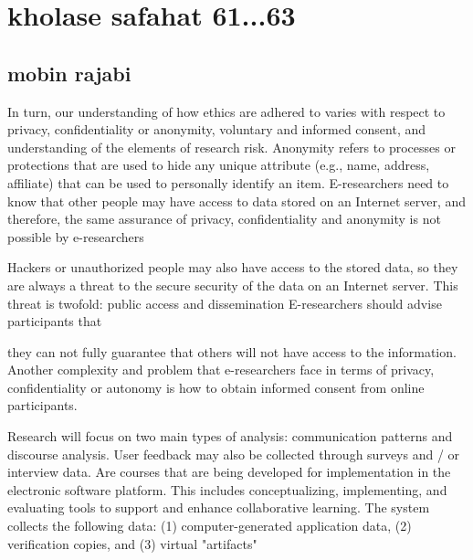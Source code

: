 \documentclass [12pt]{beamer}
\begin{document}
\section*{kholase safahat 61...63}
\subsection*{mobin rajabi}	
\begin{frame}
\justifying	
In turn, our understanding of how ethics are adhered to varies with respect to privacy, confidentiality or anonymity, voluntary and informed consent, and understanding of the elements of research risk.
Anonymity refers to processes or protections that are used to hide any unique attribute (e.g., name, address, affiliate) that can be used to personally identify an item.
E-researchers need to know that other people may have access to data stored on an Internet server, and therefore, the same assurance of privacy, confidentiality and anonymity is not possible by e-researchers
\end{frame}	
\begin{frame}
\justifying	

Hackers or unauthorized people may also have access to the stored data, so they are always a threat to the secure security of the data on an Internet server.  This threat is twofold: public access and dissemination
E-researchers should advise participants that 

they can not fully guarantee that others will not have access to the information.
Another complexity and problem that e-researchers face in terms of privacy, confidentiality or autonomy is how to obtain informed consent from online participants.
\end{frame}
\begin{frame}
\justifying	
Research will focus on two main types of analysis: communication patterns and discourse analysis.  User feedback may also be collected through surveys and / or interview data.
Are courses that are being developed for implementation in the electronic software platform.  This includes conceptualizing, implementing, and evaluating tools to support and enhance collaborative learning.
The system collects the following data: (1) computer-generated application data, (2) verification copies, and (3) virtual "artifacts"
\end{frame}
\end{document}
